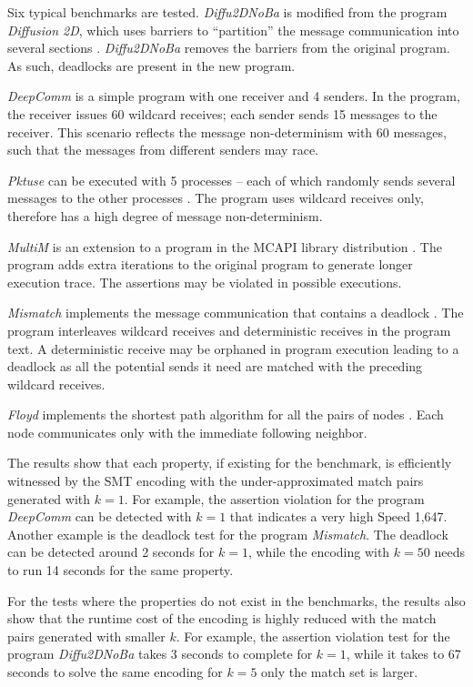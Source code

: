 Six typical benchmarks are tested. \textit{Diffu2DNoBa} is modified from the program \textit{Diffusion 2D}, which uses barriers to “partition” the message communication into several sections \cite{benchmark:fevs}. \textit{Diffu2DNoBa} removes the barriers from the original program. As such, deadlocks are present in the new program.

\textit{DeepComm} is a simple program with one receiver and 4 senders. In the program, the receiver issues 60 wildcard receives; each sender sends 15 messages to the receiver.
This scenario reflects the message non-determinism with 60 messages, such that the messages from different senders may race.

\textit{Pktuse} can be executed with 5 processes -- each of which randomly sends several messages to the other processes \cite{mpptest_benchmark}. The program uses wildcard receives only, therefore has a high degree of message non-determinism.

\textit{MultiM} is an extension to a program in the MCAPI library distribution \cite{DBLP:conf/kbse/HuangMM13}. The program adds extra iterations to the original program to generate longer execution trace. The assertions may be violated in possible executions.

\textit{Mismatch} implements the message communication that contains a deadlock \cite{HuangDeadlock}. The program interleaves wildcard receives and deterministic receives in the program text. A deterministic receive may be orphaned in program execution leading to a deadlock as all the potential sends it need are matched with the preceding wildcard receives. 

\textit{Floyd} implements the shortest path algorithm for all the pairs of nodes \cite{DBLP:conf/ppopp/XueLWGCZZV09}. Each node communicates only with the immediate following neighbor. 

The results show that each property, if existing for the benchmark, is efficiently witnessed by the SMT encoding with the under-approximated match pairs generated with $k=1$. For example, the assertion violation for the program \textit{DeepComm} can be detected with $k=1$ that indicates a very high $\mathrm{Speed}$ 1,647. Another example is the deadlock test for the program \textit{Mismatch}. 
The deadlock can be detected around 2 seconds for $k=1$, while the encoding with $k=50$ needs to run 14 seconds for the same property. 

For the tests where the properties do not exist in the benchmarks, the results also show that the runtime cost of the encoding is highly reduced with the match pairs generated with smaller $k$. For example, the assertion violation test for the program \textit{Diffu2DNoBa} takes 3 seconds to complete for $k=1$, while it takes to 67 seconds to solve the same encoding for $k=5$ only the match set is larger.

